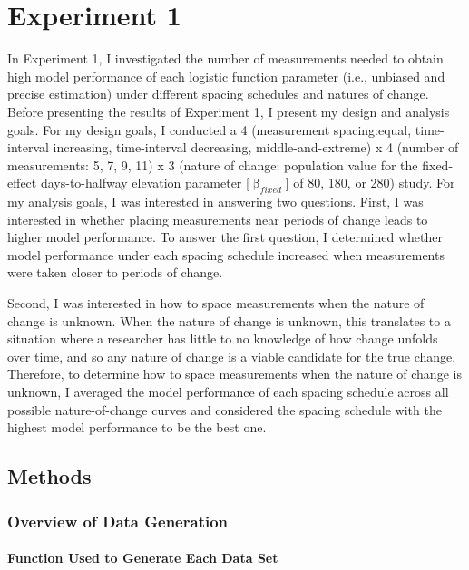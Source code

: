 \documentclass[
12pt, %
twoside,
english]{guelphthesis}
\begin{document}
\hypertarget{exp-1}{%
\chapter{Experiment 1}\label{exp-1}}

In Experiment 1, I investigated the number of measurements needed to obtain high model performance of each logistic function parameter (i.e., unbiased and precise estimation) under different spacing schedules and natures of change. Before presenting the results of Experiment 1, I present my design and analysis goals. For my design goals, I conducted a 4 (measurement spacing:equal, time-interval increasing, time-interval decreasing, middle-and-extreme) x 4 (number of measurements: 5, 7, 9, 11) x 3 (nature of change: population value for the fixed-effect days-to-halfway elevation parameter {[}\(\upbeta_{fixed}\){]} of 80, 180, or 280) study. For my analysis goals, I was interested in answering two questions. First, I was interested in whether placing measurements near periods of change leads to higher model performance. To answer the first question, I determined whether model performance under each spacing schedule increased when measurements were taken closer to periods of change.

Second, I was interested in how to space measurements when the nature of change is unknown. When the nature of change is unknown, this translates to a situation where a researcher has little to no knowledge of how change unfolds over time, and so any nature of change is a viable candidate for the true change. Therefore, to determine how to space measurements when the nature of change is unknown, I averaged the model performance of each spacing schedule across all possible nature-of-change curves and considered the spacing schedule with the highest model performance to be the best one.

\hypertarget{methods}{%
\section{Methods}\label{methods}}

\hypertarget{data-generation}{%
\subsection{Overview of Data Generation}\label{data-generation}}

\hypertarget{function-used-to-generate-each-data-set}{%
\subsubsection{Function Used to Generate Each Data Set}\label{function-used-to-generate-each-data-set}}
\end{document}
